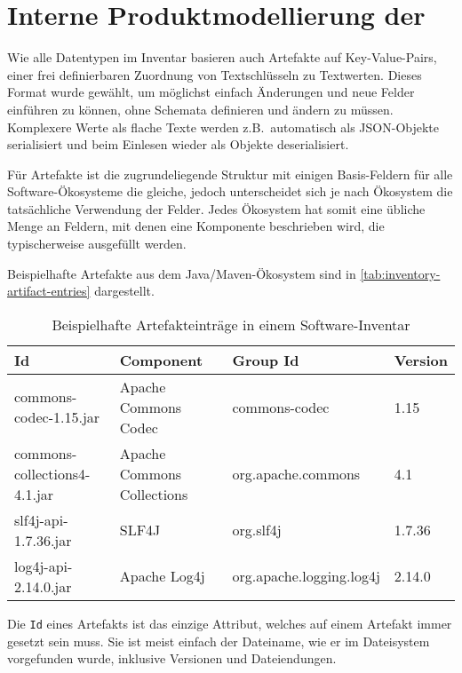 \section{Interne Produktmodellierung der \metaeffektlg}\label{sec:metaeffekt-inventory-format}

Wie alle Datentypen im Inventar basieren auch Artefakte auf Key-Value-Pairs, einer frei definierbaren Zuordnung von Textschlüsseln zu Textwerten.
Dieses Format wurde gewählt, um möglichst einfach Änderungen und neue Felder einführen zu können, ohne Schemata definieren und ändern zu müssen.
Komplexere Werte als flache Texte werden z.B.\ automatisch als JSON-Objekte serialisiert und beim Einlesen wieder als Objekte deserialisiert.

Für Artefakte ist die zugrundeliegende Struktur mit einigen Basis-Feldern für alle Software-Ökosysteme die gleiche, jedoch unterscheidet sich je nach Ökosystem die tatsächliche Verwendung der Felder.
Jedes Ökosystem hat somit eine übliche Menge an Feldern, mit denen eine Komponente beschrieben wird, die typischerweise ausgefüllt werden.

Beispielhafte Artefakte aus dem Java/Maven-Ökosystem sind in \autoref{tab:inventory-artifact-entries} dargestellt.

\begin{table}[ht]
    \caption{Beispielhafte Artefakteinträge in einem Software-Inventar}
    \label{tab:inventory-artifact-entries}
    \centering
    \begin{tabular}{llll}
        \toprule
        \textbf{Id}                  & \textbf{Component}         & \textbf{Group Id}        & \textbf{Version} \\
        \midrule
        commons-codec-1.15.jar       & Apache Commons Codec       & commons-codec            & 1.15             \\
        commons-collections4-4.1.jar & Apache Commons Collections & org.apache.commons       & 4.1              \\
        slf4j-api-1.7.36.jar         & SLF4J                      & org.slf4j                & 1.7.36           \\
        log4j-api-2.14.0.jar         & Apache Log4j               & org.apache.logging.log4j & 2.14.0           \\
        \bottomrule
    \end{tabular}
\end{table}

Die \texttt{Id} eines Artefakts ist das einzige Attribut, welches auf einem Artefakt immer gesetzt sein muss.
Sie ist meist einfach der Dateiname, wie er im Dateisystem vorgefunden wurde, inklusive Versionen und Dateiendungen.

